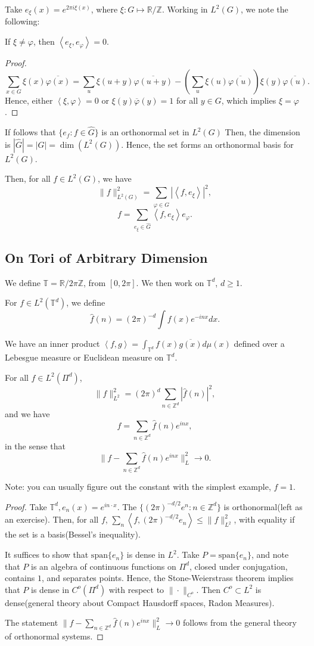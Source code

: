 \documentclass[11pt]{scrartcl}
\newcommand{\Z}{\mathbb{Z}}
\newcommand{\R}{\mathbb{R}}
\newcommand{\T}{\mathbb T}
\let \phi \varphi
\let \hat \widehat
\newcommand{\<}{\langle}
\renewcommand{\>}{\rangle}
\begin{document}
Take $e_\xi(x) = e^{2\pi i \xi(x)}$, where $\xi: G \mapsto \R/\Z$.  Working in $L^2(G)$, we note the following:

\begin{fact} If $\xi \ne \varphi$, then $\left<e_\xi, e_\varphi \right> = 0$.
\end{fact}
\begin{proof}
$$\sum_{x \in G} \xi(x) \overline{\varphi(x)} = \sum_{u} \xi(u+y)\overline{\varphi(u+y)} - \left (\sum_u \xi(u)\overline{\varphi(u)}\right ) \xi(y) \overline{\varphi(u)}.$$
Hence, either $\left < \xi, \phi\right > = 0$ or $\xi(y)\overline{\phi}(y) = 1$ for all $y \in G$, which implies $\xi = \phi$.
\end{proof}
If follows that $\{e_f : f \in \hat{G}\}$ is an orthonormal set in $L^2(G)$ Then, the dimension is $|\hat{G}| = |G| = \dim(L^2(G))$.  Hence, the set forms an orthonormal basis for $L^2(G)$.

Then, for all $f \in L^2(G)$,  we have $$\|f\|_{L^2(G)}^2 = \sum_{\phi \in \hat{G}} |\left <f, e_\xi\right >|^2,$$
$$f = \sum_{e_{\xi} \in \hat{G}} \left <f , e_{\xi}\right >e_\phi.$$

\subsection{On Tori of Arbitrary Dimension}
We define $\T = \R/2\pi\Z$, from $[0, 2\pi]$.  We then work on $\T^d$, $d \ge 1$.  

For $f \in L^2(\T^d)$, we define $$\hat{f}(n) = (2\pi)^{-d}\int f(x)e^{-inx}dx.$$

We have an inner product $\left <f, g\right > = \int_{\T^d} f(x) \overline{g(x)}d\mu(x)$ defined over a Lebesgue measure or Euclidean measure on $\T^d$. 

\begin{thm} For all $f \in L^2(\Pi^d)$,
$$\|f\|_{L^2}^2 = (2 \pi)^d \sum_{n \in \Z^d}|\hat{f}(n)|^2,$$
and we have 
$$f = \sum_{n \in \Z^d} \hat{f}(n)e^{inx},$$ in the sense that 
$$\|f - \sum_{n \in \Z^d} \hat{f}(n)e^{inx}\|_L^2 \rightarrow 0.$$ 
\end{thm}
Note: you can usually figure out the constant with the simplest example, $f = 1$.  
\begin{proof}
Take $\T^d, e_n(x) = e^{in\cdot x}$.  The $\{(2\pi)^{-d/2}e^n:n \in \Z^d\}$ is orthonormal(left as an exercise).  Then, for all $f$, $\sum_{n} \left <f, (2\pi)^{-d/2} e_n\right > \le \|f\|_{L^2}^2$, with equality if the set is a basis(Bessel's inequality).  

It suffices to show that $\text{span}\{e_n\}$ is dense in $L^2$.  Take $P = \text{span}\{e_n\}$, and note that $P$ is an algebra of continuous functions on $\Pi^d$,  closed under conjugation, contains $1$, and separates points.  Hence, the Stone-Weierstrass theorem implies that $P$ is dense in $C^o(\Pi^d)$ with respect to $\|\cdot\|_{C^o}$.  Then $C^o \subset L^2$ is dense(general theory about Compact Hausdorff spaces, Radon Measures).  

The statement $\|f - \sum_{n \in \Z^d} \hat{f}(n)e^{inx}\|_L^2 \rightarrow 0$ follows from the general theory of orthonormal systems.
\end{proof}
\end{document}
